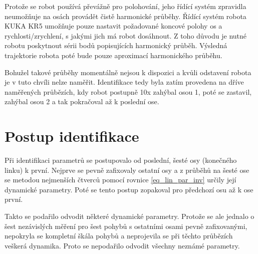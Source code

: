 Protože se robot používá převážně pro polohování, jeho řídící systém zpravidla neumožňuje na osách provádět čistě harmonické průběhy. Řídící systém robota KUKA KR5 umožňuje pouze nastavit požadované koncové polohy os a rychlosti/zrychlení, s jakými jich má robot dosáhnout. Z toho důvodu je nutné robotu poskytnout sérii bodů popisujících harmonický průběh. Výsledná trajektorie robota poté bude pouze aproximací harmonického průběhu.  

Bohužel takové průběhy momentálně nejsou k dispozici a kvůli odstavení robota je v tuto chvíli nelze naměřit. Identifikace tedy byla zatím provedena na dříve naměřených průbězích, kdy robot postupně 10x zahýbal osou 1, poté se zastavil, zahýbal osou 2 a tak pokračoval až k poslední ose. 

\section{Postup identifikace}

Při identifikaci parametrů se postupovalo od poslední, šesté osy (konečného linku) k první. Nejprve se pevně zafixovaly ostatní osy a z průběhů na šesté ose se metodou nejmenších čtverců pomocí rovnice \ref{eq_lin_par_inv} určily její dynamické parametry. Poté se tento postup zopakoval pro předchozí osu až k ose první.   

Takto se podařilo odvodit některé dynamické parametry. Protože se ale jednalo o šest nezávislých měření pro šest pohybů s ostatními osami pevně zafixovanými, nepokryla se kompletní škála pohybů a neprojevila se při těchto průbězích veškerá dynamika. Proto se nepodařilo odvodit všechny neznámé parametry. 

